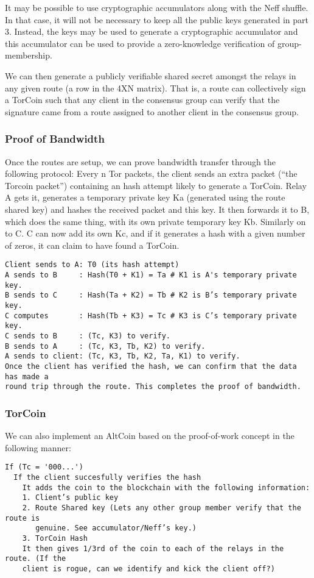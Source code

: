 It may be possible to use cryptographic accumulators along with the Neff shuffle. In that case, it will not be necessary to keep all the public keys generated in part 3. Instead, the keys may be used to generate a cryptographic accumulator and this accumulator can be used to provide a zero-knowledge verification of group-membership.

We can then generate a publicly verifiable shared secret amongst the relays in any given route (a row in the 4XN matrix). That is, a route can collectively sign a TorCoin such that any client in the consensus group can verify that the signature came from a route assigned to another client in the consensus group.

\subsubsection{Proof of Bandwidth}
Once the routes are setup, we can prove bandwidth transfer through the following protocol:
Every n Tor packets, the client sends an extra packet (“the Torcoin packet”) containing an hash attempt likely to generate a TorCoin. Relay A gets it, generates a temporary private key Ka (generated using the route shared key) and hashes the received packet and this key. It then forwards it to B, which does the same thing, with its own private temporary key Kb. Similarly on to C. C can now add its own Kc, and if it generates a hash with a given number of zeros, it can claim to have found a TorCoin.
\begin{verbatim}
Client sends to A: T0 (its hash attempt)
A sends to B     : Hash(T0 + K1) = Ta # K1 is A's temporary private key.
B sends to C     : Hash(Ta + K2) = Tb # K2 is B’s temporary private key.
C computes       : Hash(Tb + K3) = Tc # K3 is C’s temporary private key.
C sends to B     : (Tc, K3) to verify.
B sends to A     : (Tc, K3, Tb, K2) to verify.
A sends to client: (Tc, K3, Tb, K2, Ta, K1) to verify.
Once the client has verified the hash, we can confirm that the data has made a 
round trip through the route. This completes the proof of bandwidth.
\end{verbatim}

\subsubsection{TorCoin}
We can also implement an AltCoin based on the proof-of-work concept in the following manner:
\begin{verbatim}
If (Tc = '000...')
  If the client succesfully verifies the hash
    It adds the coin to the blockchain with the following information:
    1. Client’s public key
    2. Route Shared key (Lets any other group member verify that the route is 
       genuine. See accumulator/Neff’s key.)
    3. TorCoin Hash
    It then gives 1/3rd of the coin to each of the relays in the route. (If the 
    client is rogue, can we identify and kick the client off?)
\end{verbatim}

